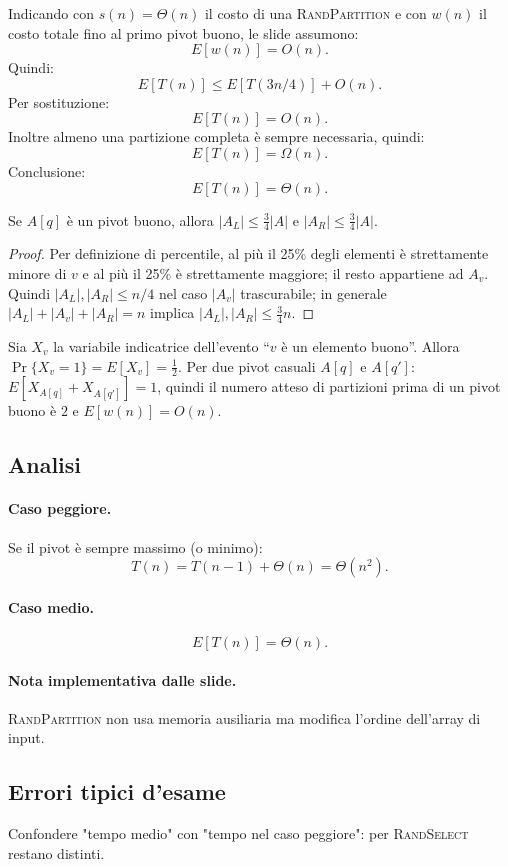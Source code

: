 Indicando con $s(n)=\Theta(n)$ il costo di una \textsc{RandPartition} e con $w(n)$ il costo totale fino al primo pivot buono, le slide assumono:
\[
E[w(n)]=O(n).
\]
Quindi:
\[
E[T(n)]\le E[T(3n/4)]+O(n).
\]
Per sostituzione:
\[
E[T(n)]=O(n).
\]
Inoltre almeno una partizione completa è sempre necessaria, quindi:
\[
E[T(n)]=\Omega(n).
\]
Conclusione:
\[
E[T(n)]=\Theta(n).
\]

\begin{lemma}
	Se $A[q]$ è un pivot buono, allora $|A_L|\le\frac{3}{4}|A|$ e $|A_R|\le\frac{3}{4}|A|$.
\end{lemma}
\begin{proof}
	Per definizione di percentile, al più il 25\% degli elementi è strettamente minore di $v$ e al più il 25\% è strettamente maggiore; il resto appartiene ad $A_v$. Quindi $|A_L|,|A_R|\le n/4$ nel caso $|A_v|$ trascurabile; in generale $|A_L|+|A_v|+|A_R|=n$ implica $|A_L|,|A_R|\le\frac{3}{4}n$.
\end{proof}

\begin{softnote}
	Sia $X_v$ la variabile indicatrice dell'evento ``$v$ è un elemento buono''. Allora $\Pr\{X_v=1\}=E[X_v]=\frac{1}{2}$.
	Per due pivot casuali $A[q]$ e $A[q']$: $E[X_{A[q]}+X_{A[q']}]=1$, quindi il numero atteso di partizioni prima di un pivot buono è $2$ e $E[w(n)]=O(n)$.
\end{softnote}

\subsection{Analisi}
\paragraph{Caso peggiore.}
Se il pivot è sempre massimo (o minimo):
\[
T(n)=T(n-1)+\Theta(n)=\Theta(n^2).
\]

\paragraph{Caso medio.}
\[
E[T(n)]=\Theta(n).
\]

\paragraph{Nota implementativa dalle slide.}
\textsc{RandPartition} non usa memoria ausiliaria ma modifica l'ordine dell'array di input.

\subsection{Errori tipici d'esame}
\begin{hardnote}
Confondere "tempo medio" con "tempo nel caso peggiore": per \textsc{RandSelect} restano distinti.
\end{hardnote}

